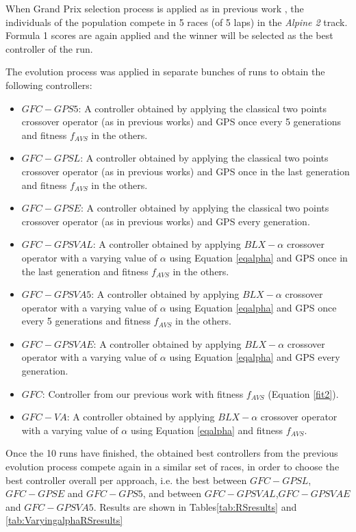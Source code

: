 \documentclass[10pt,journal,compsoc]{IEEEtran}
\begin{document}
When Grand Prix selection process is applied as in previous work \cite{salem_cig2018}, the individuals of the population compete in 5 races (of 5 laps) in the \textit{Alpine 2} track. Formula 1 scores are again applied and the winner will be selected as the best controller of the run.

The evolution process was applied in separate bunches of runs to obtain the following controllers:
\begin{itemize}
	\item $GFC-GPS5$: A controller obtained by applying the classical two points crossover operator (as in previous works) and GPS once every 5 generations and fitness $f_{AVS}$ in the others. 
	\item $GFC-GPSL$: A controller obtained by applying the classical two points crossover operator (as in previous works) and GPS once in the last generation and fitness $f_{AVS}$ in the others. 
	\item $GFC-GPSE$: A controller obtained by applying the classical two points crossover operator (as in previous works) and GPS every generation. 
	 
	\item $GFC-GPSVAL$: A controller obtained by applying $BLX-\alpha$ crossover operator with a varying value of $\alpha$ using Equation \ref{eqalpha} and GPS once in the last generation and fitness $f_{AVS}$ in the others. 
	 
	\item $GFC-GPSVA5$: A controller obtained by applying $BLX-\alpha$ crossover operator with a varying value of $\alpha$ using Equation \ref{eqalpha} and GPS once every 5 generations and fitness $f_{AVS}$ in the others. 
	 
	\item $GFC-GPSVAE$: A controller obtained by applying $BLX-\alpha$ crossover operator with a varying value of $\alpha$ using Equation \ref{eqalpha} and GPS every generation. 
	
		\item $GFC$: Controller  from our previous work \cite{salem_cig2018} with fitness  $f_{AVS}$ (Equation \ref{fit2}).
	\item $GFC-VA$: A controller obtained by applying $BLX-\alpha$ crossover operator with a varying value of $\alpha$ using Equation \ref{eqalpha} and fitness $f_{AVS}$. 	
\end{itemize}

Once the 10 runs have finished, the obtained best controllers from the previous evolution process  compete again in a similar set of races, in order to choose the best controller overall per approach, i.e. the best between $GFC-GPSL$, $GFC-GPSE$ and $GFC-GPS5$, and between $GFC-GPSVAL$,$GFC-GPSVAE$ and $GFC-GPSVA5$.
Results are shown in Tables\ref{tab:RSresults} and \ref{tab:VaryingalphaRSresults}
\end{document}
